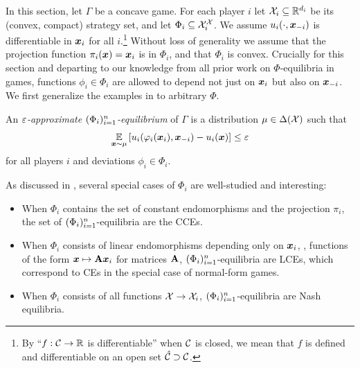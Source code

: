 In this section, let $\Gamma$ be a concave game. For each player $i$ let ${\mathcal{X}}_i \subseteq \mathbb R^{d_i}$ be its (convex, compact) strategy set, and let $\Phi_i \subseteq {\mathcal{X}}_i^{{\mathcal{X}}}$. We assume $u_i(\cdot, {\bm{x}}_{-i})$ is differentiable in ${\bm{x}}_i$ for all $i$.\footnote{By ``$f : {\mathcal{C}} \to \mathbb R$ is differentiable'' when ${\mathcal{C}}$ is closed, we mean that $f$ is defined and differentiable on an open set $\hat {{\mathcal{C}}} \supset {\mathcal{C}}$.} Without loss of generality we assume that the projection function $\pi_i({\bm{x}}) = {\bm{x}}_i$ is in $\Phi_i$, and that $\Phi_i$ is convex. Crucially for this section and departing to our knowledge from all  prior work on $\Phi$-equilibria in games, functions $\phi_i \in \Phi_i$ are allowed to depend not just on ${\bm{x}}_i$ but also on ${\bm{x}}_{-i}$. We first generalize the examples in  to arbitrary $\Phi$.
\begin{definition}
    An {\em $\varepsilon$-approximate $(\Phi_i)_{i=1}^n$-equilibrium} of $\Gamma$ is a distribution $\mu \in \Delta({\mathcal{X}})$ such that 
    \begin{align*}
        \operatorname*{\mathbb E}_{ {\bm{x}} \sim \mu } \qty[u_i(\varphi_i({\bm{x}}_i), {\bm{x}}_{-i}) - u_i({\bm{x}})] \leq \varepsilon
    \end{align*}
    for all players $i$ and deviations $\phi_i\in \Phi_i$.
\end{definition}
As discussed in , several special cases of $\Phi_i$ are well-studied and interesting:
\begin{itemize}
    \item When $\Phi_i$ contains the set of constant endomorphisms and the projection $\pi_i$, the set of $(\Phi_i)_{i=1}^n$-equilibria are the CCEs.
    \item When $\Phi_i$ consists of linear endomorphisms depending only on ${\bm{x}}_i$, \ie, functions of the form ${\bm{x}} \mapsto {\mathbf{A}} {\bm{x}}_i$ for matrices ${\mathbf{A}}$, $(\Phi_i)_{i=1}^n$-equilibria are LCEs, which correspond to CEs in the special case of  normal-form games.
    \item When $\Phi_i$ consists of all functions ${\mathcal{X}} \to  {\mathcal{X}}_i$, $(\Phi_i)_{i=1}^n$-equilibria are Nash equilibria.
\end{itemize}

